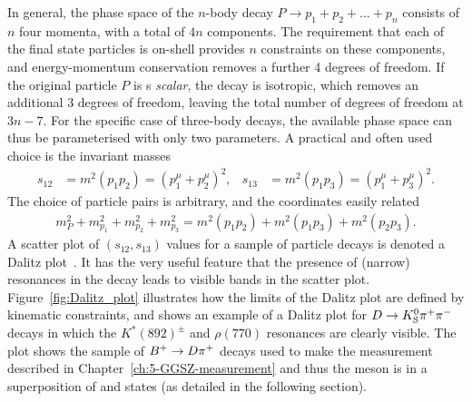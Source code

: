 In general, the phase space of the $n$-body decay $P\to p_1 + p_2 + ... + p_n$ consists of $n$ four momenta, with a total of $4n$ components. The requirement that each of the final state particles is on-shell provides $n$ constraints on these components, and energy-momentum conservation removes a further 4 degrees of freedom. If the original particle $P$ is s \emph{scalar}, the decay is isotropic, which removes an additional 3 degrees of freedom, leaving the total number of degrees of freedom at $3n-7$. For the specific case of three-body decays, the available phase space can thus be parameterised with only two parameters. A practical and often used choice is the invariant masses
\begin{align}\label{eq:dalitz_coords}
    s_{12} &= m^2(p_1p_2) = (p_1^\mu+p_2^\mu)^2, & s_{13} &= m^2(p_1p_3) = (p_1^\mu+p_3^\mu)^2.
\end{align}
The choice of particle pairs is arbitrary, and the coordinates easily related
\begin{align}
    m^2_P + m^2_{p_1} + m^2_{p_2} + m^2_{p_3} = m^2(p_1p_2) + m^2(p_1p_3) + m^2(p_2p_3).
\end{align}
A scatter plot of $(s_{12}, s_{13})$ values for a sample of particle decays is denoted a Dalitz plot~\cite{dalitzCXIIAnalysisTmeson1953}. It has the very useful feature that the presence of (narrow) resonances in the decay leads to visible bands in the scatter plot. Figure~\ref{fig:Dalitz_plot} illustrates how the limits of the Dalitz plot are defined by kinematic constraints, and shows an example of a Dalitz plot for ${D}\rightarrow{\ensuremath{{K}^0_{\mathrm{S}}}}{\ensuremath{{\pi}^+}}{\ensuremath{{\pi}^-}}$ decays in which the $K^*(892)^\pm$ and $\rho(770)$ resonances are clearly visible. The plot shows the sample of ${{{B}^+}}\rightarrow{\ensuremath{D}}{\ensuremath{{\pi}^+}}$ decays used to make the measurement described in Chapter~\ref{ch:5-GGSZ-measurement} and thus the \D meson is in a superposition of \Dz and \Dzb states (as detailed in the following section). 

